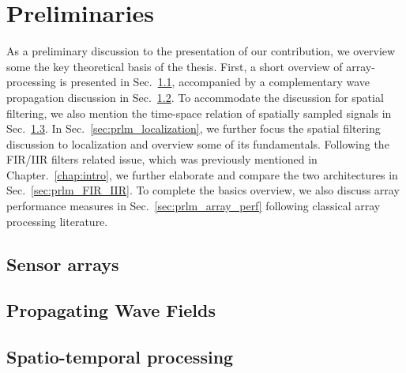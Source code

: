 \chapter{Preliminaries}
\label{chap:prelims}
As a preliminary discussion to the presentation of our contribution, we overview some the key theoretical basis of the thesis.
First, a short overview of array-processing is presented in Sec.~\ref{sec:prlm_sensorArrays}, accompanied by a complementary wave propagation discussion in Sec.~\ref{sec:prlm_propWaveField}.
To accommodate the discussion for spatial filtering, we also mention the time-space relation of spatially sampled signals in Sec.~\ref{sec:prlm_timeSpaceSig}.
In Sec.~\ref{sec:prlm_localization}, we further focus the spatial filtering discussion to localization and overview some of its fundamentals.
Following the FIR/IIR filters related issue, which was previously mentioned in Chapter.~\ref{chap:intro}, we further elaborate and compare the two architectures in Sec.~\ref{sec:prlm_FIR_IIR}.
To complete the basics overview, we also discuss array performance measures in Sec.~\ref{sec:prlm_array_perf} following classical array processing literature.

% 
\section{Sensor arrays}
\label{sec:prlm_sensorArrays}

\section{Propagating Wave Fields}
\label{sec:prlm_propWaveField}

\section{Spatio-temporal processing}
\label{sec:prlm_timeSpaceSig}

